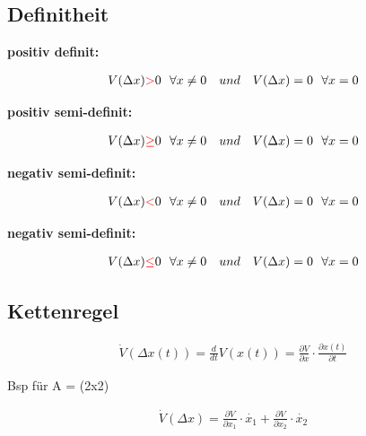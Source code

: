 \documentclass[10pt,a4paper]{article}
\begin{document}
  \subsection{Definitheit}
  \textbf{positiv definit:}
  \begin{mdframed}[style=exercise]
    \begin{align}
        V(\Delta x)  \textcolor{red}{>} 0 \ \ \forall x \neq 0 \ \ \ und \ \ \ V(\Delta x) = 0 \ \ \forall x = 0
    \end{align}
  \end{mdframed}
  \textbf{positiv semi-definit:}
  \begin{mdframed}[style=exercise]
    \begin{align}
        V(\Delta x) \textcolor{red}{\geq} 0 \ \ \forall x \neq 0 \ \ \ und \ \ \ V(\Delta x) = 0 \ \ \forall x = 0
    \end{align}
  \end{mdframed}
  \textbf{negativ semi-definit:}
  \begin{mdframed}[style=exercise]
    \begin{align}
        V(\Delta x) \textcolor{red}{<} 0 \ \ \forall x \neq 0 \ \ \ und \ \ \ V(\Delta x) = 0 \ \ \forall x = 0 
    \end{align}
  \end{mdframed}
  \textbf{negativ semi-definit:}
  \begin{mdframed}[style=exercise]
    \begin{align}
        V(\Delta x) \textcolor{red}{\leq} 0 \ \ \forall x \neq 0 \ \ \ und \ \ \ V(\Delta x) = 0 \ \ \forall x = 0 
    \end{align}
  \end{mdframed}

  \subsection{Kettenregel}
  \begin{mdframed}[style=exercise]
    \begin{align}
        \dot{V}(\Delta x(t)) = \frac{d}{dt}V(x(t)) =\frac{\partial V}{\partial x} \cdot \frac{\partial x(t)}{\partial t}  
    \end{align}
  \end{mdframed}
  Bsp für A = (2x2)
  \begin{mdframed}[style=exercise]
    \begin{align}
        \dot{V}(\Delta x) =\frac{\partial V}{\partial x_1} \cdot \dot{x_1} + \frac{\partial V}{\partial x_2} \cdot \dot{x_2}
    \end{align}
  \end{mdframed}
\end{document}

